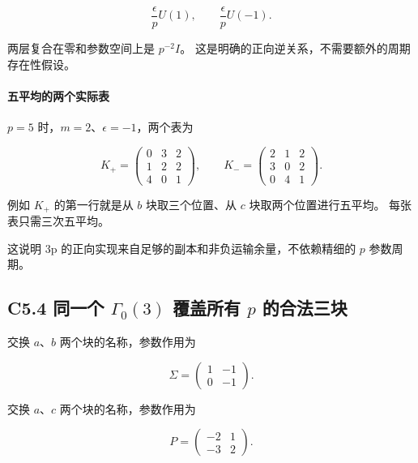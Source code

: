 \documentclass[11pt,a4paper]{article}
\theoremstyle{definition}
\numberwithin{equation}{section}
\begin{document}
\[
\boxed{\frac\epsilon pU(1),\qquad\frac\epsilon pU(-1).}
\tag{C5.3}
\]

{两层复合在零和参数空间上是} {\ensuremath{p^{-2}I}。} {这是明确的正向逆关系，不需要额外的周期存在性假设。}

\paragraph*{\texorpdfstring{{五平均的两个实际表}}{五平均的两个实际表}}\label{C5-h30}

{\ensuremath{p=5}} {时，\ensuremath{m=2}、\ensuremath{\epsilon =-1}，两个表为}

\[
K_+=\begin{pmatrix}0&3&2\\1&2&2\\4&0&1\end{pmatrix},
\qquad
K_-=\begin{pmatrix}2&1&2\\3&0&2\\0&4&1\end{pmatrix}.
\]

{例如} {\ensuremath{K_+}} {的第一行就是从} {\ensuremath{b}} {块取三个位置、从} {\ensuremath{c}} {块取两个位置进行五平均。} {每张表只需三次五平均。}

{这说明} {3p} {的正向实现来自足够的副本和非负运输余量，不依赖精细的} {\ensuremath{p}} {参数周期。}

\subsection*{\texorpdfstring{{C5.4} {同一个} {\ensuremath{\Gamma _{0}(3)}} {覆盖所有} {\ensuremath{p}} {的合法三块}}{C5.4 同一个  覆盖所有  的合法三块}}\label{C5-h31}

{交换} {\ensuremath{a}、\ensuremath{b}} {两个块的名称，参数作用为}

\[
\Sigma=\begin{pmatrix}1&-1\\0&-1\end{pmatrix}.
\]

{交换} {\ensuremath{a}、\ensuremath{c}} {两个块的名称，参数作用为}

\[
P=\begin{pmatrix}-2&1\\-3&2\end{pmatrix}.
\]
\end{document}
